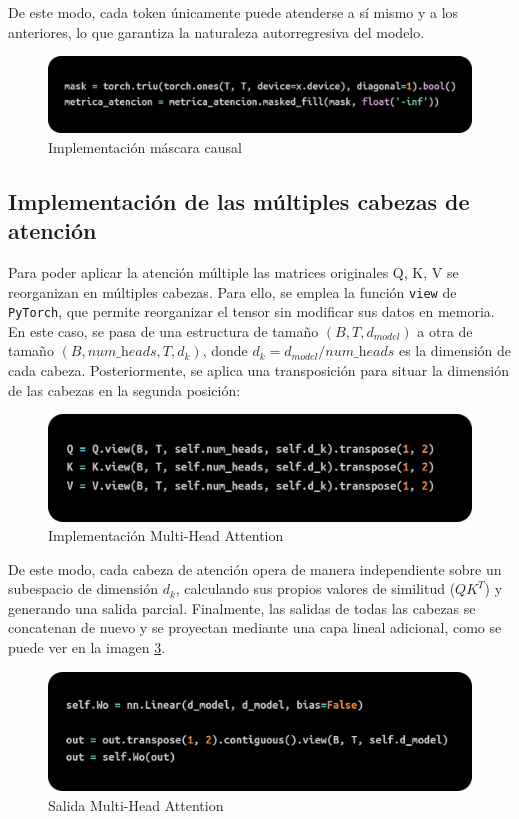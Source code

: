 \documentclass[11pt]{book}
\begin{document}
De este modo, cada token únicamente puede atenderse a sí mismo y a los anteriores, lo que garantiza la naturaleza autorregresiva del modelo.

\begin{figure}[h]
    \centering
    \includegraphics[width=0.5\linewidth]{img/masked.png}
    \caption{Implementación máscara causal}
    \label{fig:placeholder10}
\end{figure}

\subsection{Implementación de las múltiples cabezas de atención}

Para poder aplicar la atención múltiple las matrices originales Q, K, V se reorganizan en múltiples cabezas. Para ello, se emplea la función \texttt{view} de \texttt{PyTorch}, que permite reorganizar el tensor sin modificar sus datos en memoria. En este caso, se pasa de una estructura de tamaño $(B, T, d_{model})$ a otra de tamaño $(B, \textit{num\_heads}, T, d_k)$, donde $d_k = d_{model} / \textit{num\_heads}$ es la dimensión de cada cabeza. Posteriormente, se aplica una transposición para situar la dimensión de las cabezas en la segunda posición:

\begin{figure}[h]
    \centering
    \includegraphics[width=0.5\linewidth]{img/heads.png}
    \caption{Implementación Multi-Head Attention}
    \label{fig:placeholder11}
\end{figure}

De este modo, cada cabeza de atención opera de manera independiente sobre un subespacio de dimensión $d_k$, calculando sus propios valores de similitud ($QK^T$) y generando una salida parcial. Finalmente, las salidas de todas las cabezas se concatenan de nuevo y se proyectan mediante una capa lineal adicional, como se puede ver en la imagen \ref{fig:placeholder12}.

\begin{figure}[h]
    \centering
    \includegraphics[width=0.5\linewidth]{img/heads2.png}
    \caption{Salida Multi-Head Attention}
    \label{fig:placeholder12}
\end{figure}
\end{document}

